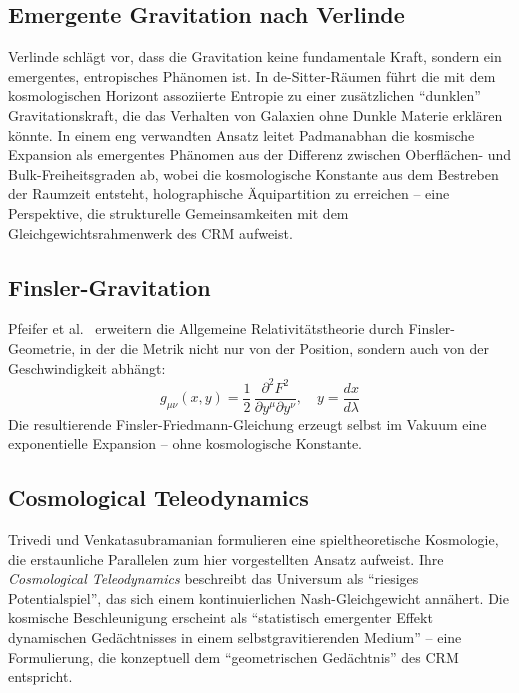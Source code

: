 \documentclass[aps,prd,twocolumn,superscriptaddress,nofootinbib]{revtex4-2}
\begin{document}
\subsection{Emergente Gravitation nach Verlinde}

Verlinde \cite{Verlinde2011, Verlinde2017} schlägt vor, dass die Gravitation keine fundamentale Kraft, sondern ein emergentes, entropisches Phänomen ist. In de-Sitter-Räumen führt die mit dem kosmologischen Horizont assoziierte Entropie zu einer zusätzlichen ``dunklen'' Gravitationskraft, die das Verhalten von Galaxien ohne Dunkle Materie erklären könnte. In einem eng verwandten Ansatz leitet Padmanabhan \cite{Padmanabhan2012} die kosmische Expansion als emergentes Phänomen aus der Differenz zwischen Oberflächen- und Bulk-Freiheitsgraden ab, wobei die kosmologische Konstante aus dem Bestreben der Raumzeit entsteht, holographische Äquipartition zu erreichen -- eine Perspektive, die strukturelle Gemeinsamkeiten mit dem Gleichgewichtsrahmenwerk des CRM aufweist.

\subsection{Finsler-Gravitation}

Pfeifer et al.\ \cite{Pfeifer2025} erweitern die Allgemeine Relativitätstheorie durch Finsler-Geometrie, in der die Metrik nicht nur von der Position, sondern auch von der Geschwindigkeit abhängt:
\begin{equation}
g_{\mu\nu}(x, y) = \frac{1}{2}\,\frac{\partial^2 F^2}{\partial y^\mu \partial y^\nu}, \quad y = \frac{dx}{d\lambda}
\end{equation}
Die resultierende Finsler-Friedmann-Gleichung erzeugt selbst im Vakuum eine exponentielle Expansion -- ohne kosmologische Konstante.

\subsection{Cosmological Teleodynamics}

Trivedi und Venkatasubramanian \cite{Trivedi2025} formulieren eine spieltheoretische Kosmologie, die erstaunliche Parallelen zum hier vorgestellten Ansatz aufweist. Ihre \textit{Cosmological Teleodynamics} beschreibt das Universum als ``riesiges Potentialspiel'', das sich einem kontinuierlichen Nash-Gleichgewicht annähert. Die kosmische Beschleunigung erscheint als ``statistisch emergenter Effekt dynamischen Gedächtnisses in einem selbstgravitierenden Medium'' -- eine Formulierung, die konzeptuell dem ``geometrischen Gedächtnis'' des CRM entspricht.
\end{document}

